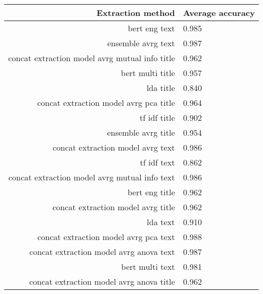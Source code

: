 \begin{tabular}{|r|l|}
  \hline
  Extraction method & Average accuracy \\ 
  \hline
  bert eng text & 0.985 \\ 
  \hline
  ensemble avrg text & 0.987 \\ 
  \hline
  concat extraction model avrg mutual info title & 0.962 \\ 
  \hline
  bert multi title & 0.957 \\ 
  \hline
  lda title & 0.840 \\ 
  \hline
  concat extraction model avrg pca title & 0.964 \\ 
  \hline
  tf idf title & 0.902 \\ 
  \hline
  ensemble avrg title & 0.954 \\ 
  \hline
  concat extraction model avrg text & 0.986 \\ 
  \hline
  tf idf text & 0.862 \\ 
  \hline
  concat extraction model avrg mutual info text & 0.986 \\ 
  \hline
  bert eng title & 0.962 \\ 
  \hline
  concat extraction model avrg title & 0.962 \\ 
  \hline
  lda text & 0.910 \\ 
  \hline
  concat extraction model avrg pca text & 0.988 \\ 
  \hline
  concat extraction model avrg anova text & 0.987 \\ 
  \hline
  bert multi text & 0.981 \\ 
  \hline
  concat extraction model avrg anova title & 0.962 \\ 
  \hline
\end{tabular}
